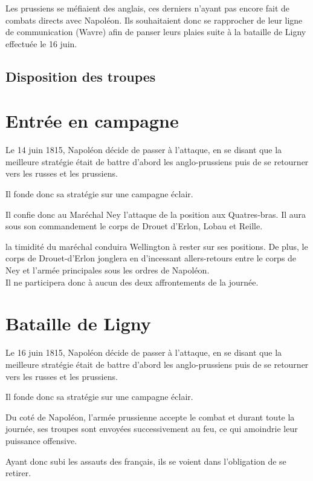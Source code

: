 Les prussiens se méfiaient des anglais, ces derniers n'ayant pas encore fait de combats directs avec 
Napoléon. Ils souhaitaient donc se rapprocher de leur ligne de communication (Wavre) afin de panser 
leurs plaies suite à la bataille de Ligny effectuée le 16 juin.\\


\subsection{Disposition des troupes}

\section{Entrée en campagne}

Le 14 juin 1815, Napoléon décide de passer à l'attaque, en se disant que la meilleure stratégie était de battre d'abord les anglo-prussiens puis de se retourner vers les russes et les prussiens.

Il fonde donc sa stratégie sur une campagne éclair.


Il confie donc au Maréchal Ney l'attaque de la position aux Quatres-bras. Il aura sous son commandement le corps de Drouet d'Erlon, Lobau et Reille. 

la timidité du maréchal conduira Wellington à rester sur ses positions. De plus, le corps de Drouet-d'Erlon jonglera en d'incessant allers-retours entre le corps de Ney et l'armée principales sous les ordres de Napoléon.\\ Il ne participera donc à aucun des deux affrontements de la journée.

\section{Bataille de Ligny}

Le 16 juin 1815, Napoléon décide de passer à l'attaque, en se disant que la meilleure stratégie était de battre d'abord les anglo-prussiens puis de se retourner vers les russes et les prussiens.

Il fonde donc sa stratégie sur une campagne éclair.


Du coté de Napoléon, l'armée prussienne accepte le combat et durant toute la journée, ses troupes sont envoyées successivement au feu, ce qui amoindrie leur puissance offensive.

Ayant donc subi les assauts des français, ils se voient dans l'obligation de se retirer.

